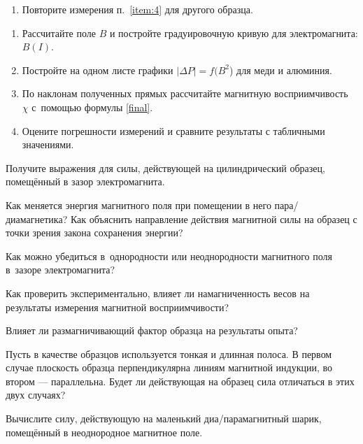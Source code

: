 \begin{lab:task}
\begin{enumerate}
Арретируйте весы. Установите минимальное значение тока и проведите измерение
равновесного значения массы.

Повторите измерения $\Delta P(I)$ для 6--8 других значений тока.

\item Повторите измерения п.~\ref{item:4} для другого образца.

\end{enumerate}


\begin{enumerate}
	\item Рассчитайте поле $B$ и постройте градуировочную кривую для
электромагнита: $B(I)$.
	\item Постройте на одном листе графики $|\Delta P|=f(B^2$) для меди и
алюминия.
	\item По наклонам полученных прямых рассчитайте магнитную восприимчивость~$\chi$
    с~помощью формулы \eqref{final}.
	\item Оцените погрешности измерений и сравните результаты с табличными
значениями.
\end{enumerate}

\end{lab:task}


\begin{lab:questions}
	\item Получите выражения для силы, действующей на цилиндрический образец,
помещённый в зазор электромагнита.
    \item Как меняется энергия магнитного поля при помещении в него
пара/диамагнетика? Как объяснить направление действия магнитной силы
на образец с точки зрения закона сохранения энергии?
    \item Как можно убедиться в~однородности или неоднородности магнитного поля
в~зазоре электромагнита?
	\item Как проверить экспериментально, влияет ли намагниченность весов на
результаты измерения магнитной восприимчивости?
    \item Влияет ли размагничивающий фактор образца на результаты опыта?
	\item Пусть в качестве образцов используется тонкая и длинная полоса.
    В первом случае плоскость образца перпендикулярна линиям магнитной индукции,
    во втором --- параллельна. Будет ли действующая на образец сила
    отличаться в этих двух случаях?
    \item Вычислите силу, действующую на маленький диа/парамагнитный шарик,
    помещённый в неоднородное магнитное поле.
\end{lab:questions}


